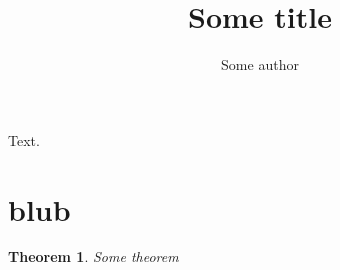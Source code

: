 \documentclass{aomart}
\title{Some title}
\author{Some author}
\newtheorem{thm}{Theorem}
\begin{document}
\maketitle
Text.

\section{blub}

\begin{thm}
Some theorem
\end{thm}
\end{document}
